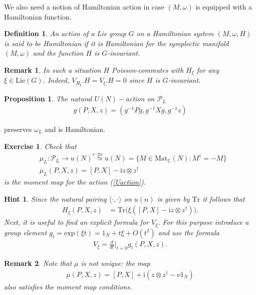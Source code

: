 \documentclass[12pt]{article}
\newtheorem{pr}{Proposition}[section]
\newtheorem{exer}{Exercise}[section]
\newtheorem{defn}{Definition}[section]
\newtheorem{rem}{Remark}[section]
\newtheorem{hint}{Hint}[section]
\numberwithin{equation}{section}
\theoremstyle{definition}
\newcommand {\ii} {\mathrm{i}}
\begin{document}
 
 We also need a notion of Hamiltonian action in case $(M, \omega)$ is equipped with a Hamiltonian function.
\begin{defn}\normalfont
An action of a Lie group $G$ on a Hamiltonian system $(M, \omega, H)$ is said to be Hamiltonian if it is Hamiltonian for the symplectic manifold $(M, \omega)$ and the function $H$ is $G$-invariant.
\end{defn}
\begin{rem}\label{rem:poiscom}
    In such a situation $H$ Poisson-commutes with $H_{\xi}$ for any $\xi \in \mathrm{Lie}(G)$. Indeed, $V_{H_{\xi}}.H = V_{\xi}.H=0$ since $H$ is $G$-invariant.
\end{rem}
\begin{pr}
    The natural $U(N)-$action on $\mathcal{P}_{L}$
\begin{align}\label{Uaction}
     g ( P, X, z ) = ( g^{-1} P g, g^{-1} X g, g^{-1} z )
 \end{align}
\end{pr}
preserves $\omega_{L}$ and is Hamiltonian.
 \begin{exer}\normalfont
     Check that 
\begin{align}
 &\mu_{L} : \mathcal{P}_{L} \rightarrow u(N)^{*} \stackrel{Tr}{\simeq} u(N) = \{ M \in \mathrm{Mat}_{\mathbb{C}}(N): M^{\dagger} = - M \}\nonumber \\
     &\mu_{L} (P, X, z) = [P, X] - {\ii} z \otimes z^{\dagger}\label{muL}
\end{align}
is the moment map for the action (\ref{Uaction}).
\end{exer}
\begin{hint}\normalfont
Since the natural pairing $\langle \cdot, \cdot \rangle$ on $u(n)$ is given by $\mathrm{Tr}$ it follows that
\begin{align*}
    H_{\xi}(P, X, z) &= \mathrm{Tr} \big( \xi ([P, X] - {\ii} z \otimes z^{\dagger})\big).
\end{align*}
Next, it is useful to find an explicit formula for $V_{\xi}$. For this purpose introduce a group element $g_{t} = \mathrm{exp}(\xi t) = 1_{N} + t \xi + O(t^2)$ and use the formula
\begin{align*}
    V_{\xi} = \frac{d}{dt}\bigg|_{t=0}g_{t}(P, X, z).
\end{align*}
\end{hint}
\begin{rem}\normalfont
    Note that $\mu$ is not unique: the map
\begin{align}\label{mmap}
    \mu (P, X, z) = [P, X] + {\ii} ( z \otimes z^{\dagger} - \nu 1_{N})
\end{align}
also satisfies the moment map conditions.
\end{rem}
\end{document}
